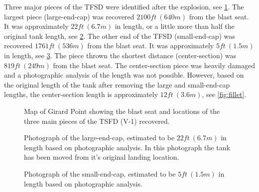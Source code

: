 \documentclass[10pt,parskip=half,
toc=sectionentrywithdots,
bibliography=totocnumbered,
captions=tableheading,numbers=noendperiod]{scrartcl}
\begin{document}
Three major pieces of the TFSD were identified after the explosion, see
\cref{fig:blast_debris}. The largest piece (large-end-cap) was recovered
\(2100ft\:(640m)\) from the blast seat. It was approximately
\(22ft\:(6.7m)\) in length, or a little more than half the original tank
length, see \cref{fig:large_end_cap}. The other end of the TFSD
(small-end-cap) was recovered \(1761ft\:(536m)\) from the blast seat. It
was approximately \(5ft\:(1.5m)\) in length, see
\cref{fig:small_end_cap}. The piece thrown the shortest distance
(center-section) was \(819ft\:(249m)\) from the blast seat. The
center-section piece was heavily damaged and a photographic analysis of
the length was not possible. However, based on the original length of
the tank after removing the large and small-end-cap lengths, the
center-section length is approximately \(12ft\:(3.6m)\), see
\cref{fig:fillet}.

\begin{figure}[H]
\hypertarget{fig:blast_debris}{%
\begin{center}
\end{center}
\caption{Map of Girard Point showing the blast seat and locations of the three
main pieces of the TSFD (V-1) recovered.\cite{Malone2019a}}\label{fig:blast_debris}
}
\end{figure}

\begin{figure}[H]
\hypertarget{fig:large_end_cap}{%
\begin{center}
\end{center}
\caption{Photograph of the large-end-cap, estimated to be \(22ft\:(6.7m)\) in
length based on photographic analysis. In this photograph the tank has
been moved from it's original landing location.\cite{Malone2019a}}\label{fig:large_end_cap}
}
\end{figure}

\begin{figure}[H]
\hypertarget{fig:small_end_cap}{%
\begin{center}
\end{center}
\caption{Photograph of the small-end-cap, estimated to be \(5ft\:(1.5m)\) in
length based on photographic analysis.\cite{Malone2019a}}\label{fig:small_end_cap}
}
\end{figure}
\end{document}
